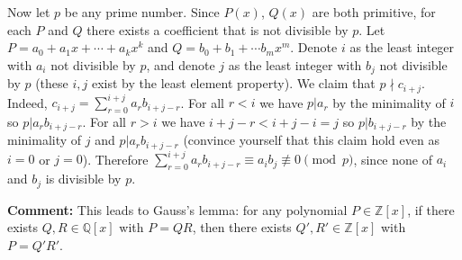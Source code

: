 \documentclass[11pt]{article}
\begin{document}
\begin{enumerate}
Now let $p$ be any prime number. Since $P(x)$, $Q(x)$ are both primitive, for each $P$ and $Q$ there exists a coefficient that is not divisible by $p$. Let $P=a_0+a_1x+\cdots + a_kx^k$ and $Q=b_0+b_1+\cdots b_mx^m$. Denote $i$ as the least integer with $a_i$ not divisible by $p$, and denote $j$ as the least integer with $b_j$ not divisible by $p$ (these $i, j$ exist by the least element property). We claim that $p\nmid c_{i+j}$. Indeed, $c_{i+j}=\displaystyle\sum_{r=0}^{i+j} a_rb_{i+j-r}$. For all $r< i$ we have $p|a_r$ by the minimality of $i$ so $p|a_rb_{i+j-r}$. For all $r>i$ we have $i+j-r<i+j-i=j$ so $p|b_{i+j-r}$ by the minimality of $j$ and $p|a_rb_{i+j-r}$ (convince yourself that this claim hold even as $i=0$ or $j=0$). Therefore $\displaystyle\sum_{r=0}^{i+j} a_rb_{i+j-r}\equiv a_ib_j\not\equiv 0\pmod{p}$, since none of $a_i$ and $b_j$ is divisible by $p$.

\textbf{Comment:} This leads to Gauss's lemma: for any polynomial $P\in\mathbb{Z}[x]$, if there exists $Q,R\in\mathbb{Q}[x]$ with $P=QR$, then there exists $Q', R'\in\mathbb{Z}[x]$ with $P=Q'R'$.
\end{enumerate}
\end{document}
